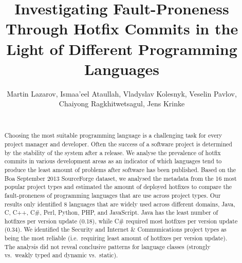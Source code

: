 \documentclass{sig-alternate}
\newcommand\FIXME[1]{\textbf{FIXME: #1}}
\begin{document}
\title{Investigating Fault-Proneness Through Hotfix Commits in the Light of Different Programming Languages}
\author{
  Martin Lazarov, Ismaa'eel Ataullah, Vladyslav Kolesnyk, Veselin Pavlov,\\ Chaiyong Ragkhitwetsagul, Jens Krinke\\
  \\
}

\maketitle

\begin{abstract}
Choosing the most suitable programming language is a challenging task for every project manager and developer. Often the success of a software project is determined by the stability of the system after a release. We analyse the prevalence of hotfix commits in various development areas as an indicator of which languages tend to produce the least amount of problems after software has been published. Based on the Boa September 2013 SourceForge dataset, we analysed the metadata from the 16 most popular project types and estimated the amount of deployed hotfixes to compare the fault-proneness of programming languages that are use across project types. Our results only identified 8 languages that are widely used across different domains, Java, C, C++, C\#, Perl, Python, PHP, and JavaScript. Java has the least number of hotfixes per version update (0.18), while C\# required most hotfixes per version update (0.34). We identified the Security and Internet \& Communications project types as being the most reliable (i.e.\ requiring least amount of hotfixes per version update). The analysis did not reveal conclusive patterns for language classes (strongly vs.\ weakly typed and dynamic vs.\ static).
\end{abstract}



\end{document}
